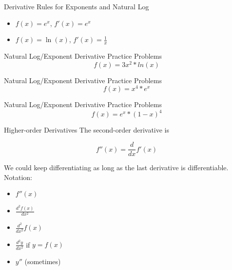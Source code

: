 \documentclass[aspectratio=169]{beamer}
\begin{document}
\begin{frame}{Derivative Rules for Exponents and Natural Log}\label{main1}
\begin{itemize}
\begin{itemize}
    \item \(f(x) = e^x\), \(f'(x) = e^x\)
    \item \(f(x) = \ln(x)\), \(f'(x) = \frac{1}{x}\)
\end{itemize}
\end{itemize}
\end{frame}

\begin{frame}{Natural Log/Exponent Derivative Practice Problems}\label{main1}
	\vspace{-4cm}
    \[
    f(x) = 3x^{2}*ln(x)
    \]
\end{frame}


\begin{frame}{Natural Log/Exponent Derivative Practice Problems}\label{main1}
	\vspace{-4cm}
    \[
    f(x) = x^{4}*e^{x}
    \]
\end{frame}

\begin{frame}{Natural Log/Exponent Derivative Practice Problems}\label{main1}
	\vspace{-4cm}
    \[
    f(x) = e^{x}*(1-x)^{4}
    \]
\end{frame}

\begin{frame}{Higher-order Derivatives}\label{main1}
The second-order derivative is

\[
f''(x) = \frac{d}{dx} f'(x)
\]

We could keep differentiating as long as the last derivative is differentiable. Notation:
\begin{itemize}
\begin{itemize}
    \item $f''(x)$
    \item $\frac{d^2 f(x)}{dx^2}$
    \item $\frac{d^2}{dx^2} f(x)$
    \item $\frac{d^2 y}{dx^2}$ if $y = f(x)$
    \item $y''$ (sometimes)
\end{itemize}
\end{itemize}
\end{frame}
\end{document}
